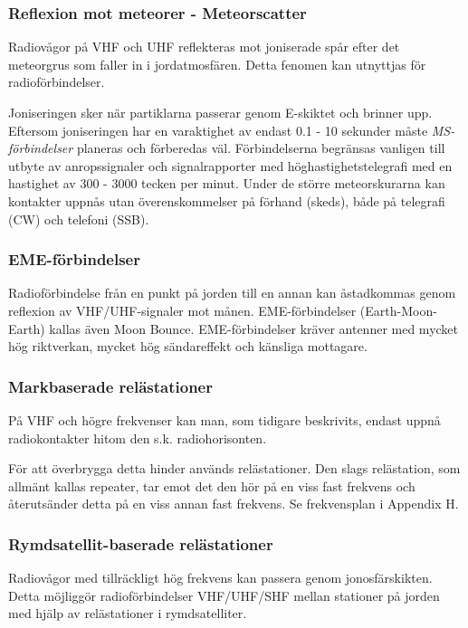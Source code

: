 \subsubsection{Reflexion mot meteorer - Meteorscatter}

Radiovågor på VHF och UHF reflekteras mot joniserade spår efter det
meteorgrus som faller in i jordatmosfären. Detta fenomen kan utnyttjas
för radioförbindelser.

Joniseringen sker när partiklarna passerar genom E-skiktet och brinner
upp. Eftersom joniseringen har en varaktighet av endast 0.1 - 10
sekunder måste \emph{MS-förbindelser} planeras och förberedas
väl. Förbindelserna begränsas vanligen till utbyte av anropssignaler
och signalrapporter med höghastighetstelegrafi med en hastighet av 300
- 3000 tecken per minut. Under de större meteorskurarna kan kontakter
uppnås utan överenskommelser på förhand (skeds), både på telegrafi
(CW) och telefoni (SSB).

\subsubsection{EME-förbindelser}

Radioförbindelse från en punkt på jorden till en annan kan åstadkommas
genom reflexion av VHF/UHF-signaler mot månen. EME-förbindelser
(Earth-Moon-Earth) kallas även Moon Bounce. EME-förbindelser kräver
antenner med mycket hög riktverkan, mycket hög sändareffekt och
känsliga mottagare.

\subsubsection{Markbaserade relästationer}

På VHF och högre frekvenser kan man, som tidigare beskrivits, endast
uppnå radiokontakter hitom den s.k. radiohorisonten.

För att överbrygga detta hinder används relästationer. Den slags
relästation, som allmänt kallas repeater, tar emot det den hör på en
viss fast frekvens och återutsänder detta på en viss annan fast
frekvens. Se frekvensplan i Appendix H. %

\subsubsection{Rymdsatellit-baserade relästationer}

Radiovågor med tillräckligt hög frekvens kan passera genom
jonosfärskikten. Detta möjliggör radioförbindelser VHF/UHF/SHF mellan
stationer på jorden med hjälp av relästationer i rymdsatelliter.

